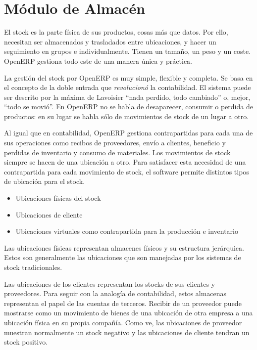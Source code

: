 \chapter{Módulo de Almacén}

El stock es la parte física de sus productos, cosas más que datos. Por ello, necesitan ser almacenados y trasladados entre ubicaciones, y hacer un seguimiento en grupos e individualmente. Tienen un tamaño, un peso y un coste. OpenERP gestiona todo este de una manera única y práctica.

La gestión del stock por OpenERP es muy simple, flexible y completa. Se basa en el concepto de la doble entrada que \emph{revolucionó} la contabilidad. El sistema puede ser descrito por la máxima de Lavoisier “nada perdido, todo cambiado” o, mejor, “todo  se movió”. En OpenERP no se habla de desaparecer, consumir o perdida de productos: en su lugar se habla sólo de movimientos de stock de un lugar a otro.


Al igual que en contabilidad, OpenERP gestiona contrapartidas para cada una de sus operaciones como recibos de proveedores, envío a clientes, beneficio y perdidas de inventario y consumo de materiales. Los movimientos de stock siempre se hacen de una ubicación a otro. Para satisfacer esta necesidad de una contrapartida para cada movimiento de stock, el software permite distintos tipos de ubicación para el stock.

\begin{itemize}
\item Ubicaciones físicas del stock
\item Ubicaciones de cliente
\item Ubicaciones virtuales como contrapartida para la producción e inventario
\end{itemize}

Las ubicaciones físicas representan almacenes físicos y su estructura jerárquica. Estos son generalmente las ubicaciones que son manejadas por los sistemas de stock tradicionales.

Las ubicaciones de los clientes representan los stocks de sus clientes y proveedores. Para seguir con la analogía de contabilidad, estos almacenas representan el papel de las cuentas de terceros. Recibir de un proveedor puede mostrarse como un movimiento de bienes de una ubicación de otra empresa a una ubicación física en su propia compañía. Como ve, las ubicaciones de proveedor muestran normalmente un stock negativo y las ubicaciones de cliente tendran un stock positivo.


